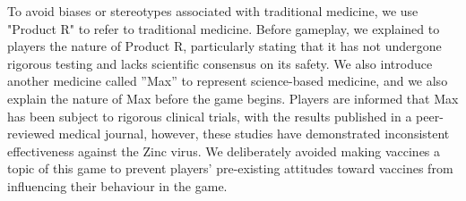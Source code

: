 To avoid biases or stereotypes associated with traditional medicine, we use "Product R" to refer to traditional medicine. Before gameplay, we explained to players the nature of Product R, particularly stating that it has not undergone rigorous testing and lacks scientific consensus on its safety. We also introduce another medicine called ”Max” to represent science-based medicine, and we also explain the nature of Max before the game begins. %
Players are informed that Max has been subject to rigorous clinical trials, with the results published in a peer-reviewed medical journal, however, these studies have demonstrated inconsistent effectiveness against the Zinc virus.
We deliberately avoided making vaccines a topic of this game to prevent players' pre-existing attitudes toward vaccines from influencing their behaviour in the game.



